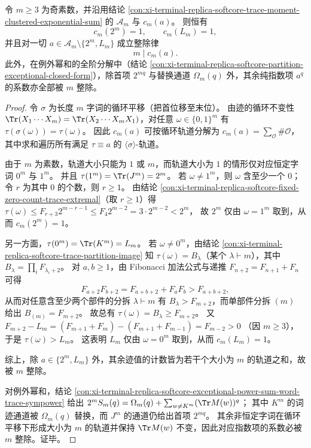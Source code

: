 \begin{conclusion}\label{con:xi-terminal-replica-softcore-trace-moment-prime-orbit-divisibility}
令 \(m\ge 3\) 为奇素数，并沿用结论 \ref{con:xi-terminal-replica-softcore-trace-moment-clustered-exponential-sum} 的 \(\mathcal A_m\) 与 \(c_m(a)\)。
则恒有
\[
c_m(2^m)=1,\qquad c_m(L_m)=1,
\]
并且对一切 \(a\in\mathcal A_m\setminus\{2^m,L_m\}\) 成立整除律
\[
m\mid c_m(a).
\]
此外，在例外幂和的全阶分解中（结论 \ref{con:xi-terminal-replica-softcore-partition-exceptional-closed-form}），除首项 \(2^{mq}\) 与替换通道 \(\Omega_m(q)\) 外，其余纯指数项 \(a^q\) 的系数亦全部被 \(m\) 整除。
\end{conclusion}
\begin{proof}
令 \(\sigma\) 为长度 \(m\) 字词的循环平移（把首位移至末位）。
由迹的循环不变性 \(\Tr(X_1\cdots X_m)=\Tr(X_2\cdots X_mX_1)\)，对任意 \(\omega\in\{0,1\}^m\) 有
\(
\tau(\sigma(\omega))=\tau(\omega)
\)。
因此 \(c_m(a)\) 可按循环轨道分解为
\(
c_m(a)=\sum_{\mathcal O}\#\mathcal O
\)，其中求和遍历所有满足 \(\tau\equiv a\) 的 \(\langle\sigma\rangle\)-轨道。
\par
由于 \(m\) 为素数，轨道大小只能为 \(1\) 或 \(m\)，而轨道大小为 \(1\) 的情形仅对应恒定字词 \(0^m\) 与 \(1^m\)。
并且 \(\tau(1^m)=\Tr(J^m)=2^m\)。
若 \(\omega\neq 1^m\)，则 \(\omega\) 含至少一个 \(0\)；令 \(r\) 为其中 \(0\) 的个数，则 \(r\ge 1\)。
由结论 \ref{con:xi-terminal-replica-softcore-fixed-zero-count-trace-extremal}（取 \(r\ge 1\)）得
\(
\tau(\omega)\le F_{r+3}2^{m-r-1}\le F_4 2^{m-2}=3\cdot 2^{m-2}<2^m
\)，
故 \(2^m\) 仅由 \(\omega=1^m\) 取到，从而 \(c_m(2^m)=1\)。
\par
另一方面，\(\tau(0^m)=\Tr(K^m)=L_m\)。
若 \(\omega\neq 0^m\)，由结论 \ref{con:xi-terminal-replica-softcore-trace-partition-image} 知 \(\tau(\omega)=B_\lambda\)（某个 \(\lambda\vdash m\)），其中 \(B_\lambda=\prod_i F_{\lambda_i+2}\)。
对 \(a,b\ge 1\)，由 Fibonacci 加法公式与递推 \(F_{n+2}=F_{n+1}+F_n\) 可得
\[
F_{a+2}F_{b+2}=F_{a+b+2}+F_aF_b>F_{a+b+2},
\]
从而对任意含至少两个部件的分拆 \(\lambda\vdash m\) 有 \(B_\lambda>F_{m+2}\)，而单部件分拆 \((m)\) 给出 \(B_{(m)}=F_{m+2}\)。
故总有 \(\tau(\omega)=B_\lambda\ge F_{m+2}\)。
又
\(
F_{m+2}-L_m=(F_{m+1}+F_m)-(F_{m+1}+F_{m-1})=F_{m-2}>0
\)
（因 \(m\ge 3\)），于是 \(\tau(\omega)>L_m\)。
这表明 \(L_m\) 仅由 \(\omega=0^m\) 取到，从而 \(c_m(L_m)=1\)。
\par
综上，除 \(a\in\{2^m,L_m\}\) 外，其余迹值的计数皆为若干个大小为 \(m\) 的轨道之和，故被 \(m\) 整除。
\par
对例外幂和，结论 \ref{con:xi-terminal-replica-softcore-exceptional-power-sum-word-trace-sympower} 给出
\(
2^mS_m(q)=\Omega_m(q)+\sum_{w\neq K^m}(\Tr M(w))^q
\)；
其中 \(K^m\) 的词迹通道被 \(\Omega_m(q)\) 替换，而 \(J^m\) 的通道仍给出首项 \(2^{mq}\)。
其余非恒定字词在循环平移下形成大小为 \(m\) 的轨道并保持 \(\Tr M(w)\) 不变，因此对应指数项的系数必被 \(m\) 整除。证毕。
\end{proof}

\endinput

